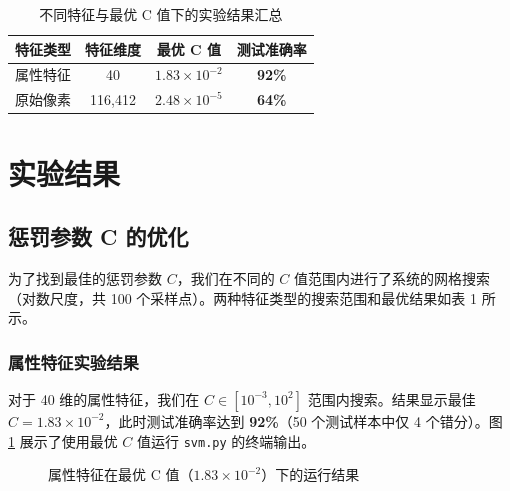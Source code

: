 \documentclass[UTF8]{ctexart}
\begin{document}
\vspace{1em}

\begin{table}[H]
    \centering
    \caption{不同特征与最优 C 值下的实验结果汇总}
    \begin{tabular}{lccc}
    \toprule
    \textbf{特征类型} & \textbf{特征维度} & \textbf{最优 C 值} & \textbf{测试准确率} \\
    \midrule
    属性特征 & 40 & $1.83 \times 10^{-2}$ & \textbf{92\%} \\
    原始像素 & 116,412 & $2.48 \times 10^{-5}$ & \textbf{64\%} \\
    \bottomrule
    \end{tabular}
\end{table}

\vspace{0.5em}

\section{实验结果}

\subsection{惩罚参数 C 的优化}

为了找到最佳的惩罚参数 $C$，我们在不同的 $C$ 值范围内进行了系统的网格搜索（对数尺度，共 100 个采样点）。两种特征类型的搜索范围和最优结果如表 1 所示。

\subsubsection{属性特征实验结果}

对于 40 维的属性特征，我们在 $C \in [10^{-3}, 10^{2}]$ 范围内搜索。结果显示最佳 $C = 1.83 \times 10^{-2}$，此时测试准确率达到 \textbf{92\%}（50 个测试样本中仅 4 个错分）。图 \ref{fig:terminal_attrs} 展示了使用最优 $C$ 值运行 \texttt{svm.py} 的终端输出。

\begin{figure}[H]
    \centering
    \caption{属性特征在最优 C 值（$1.83 \times 10^{-2}$）下的运行结果}
    \label{fig:terminal_attrs}
\end{figure}
\end{document}

